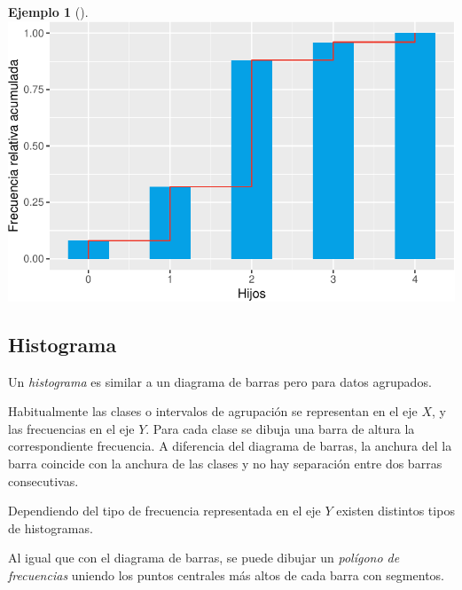 \documentclass[
  a4paper,
]{scrreport}
\theoremstyle{plain}
\theoremstyle{definition}
\theoremstyle{definition}
\newtheorem{example}{Ejemplo}[chapter]
\theoremstyle{remark}
\begin{document}
\begin{example}[]
\includegraphics{02-estadistica-descriptiva_files/figure-pdf/poligono-relativas-acumuladas-1.pdf}

\end{example}

\subsection{Histograma}\label{histograma}

Un \emph{histograma} es similar a un diagrama de barras pero para datos
agrupados.

Habitualmente las clases o intervalos de agrupación se representan en el
eje \(X\), y las frecuencias en el eje \(Y\). Para cada clase se dibuja
una barra de altura la correspondiente frecuencia. A diferencia del
diagrama de barras, la anchura del la barra coincide con la anchura de
las clases y no hay separación entre dos barras consecutivas.

Dependiendo del tipo de frecuencia representada en el eje \(Y\) existen
distintos tipos de histogramas.

Al igual que con el diagrama de barras, se puede dibujar un
\emph{polígono de frecuencias} uniendo los puntos centrales más altos de
cada barra con segmentos.
\end{document}
